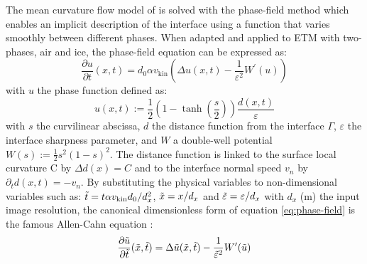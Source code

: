 \documentclass[draft,ms]{agujournal2019}
\begin{document}
The mean curvature flow model of  is solved with the phase-field method which enables an implicit description of the interface using a function that varies smoothly between different phases. When adapted and applied to ETM with two-phases, air and ice, the phase-field equation can be expressed as:\\
\begin{equation}\label{eq:phase-field}\frac{\partial u}{\partial t}(x, t)= d_0 \alpha v_{\mathrm{kin}} \left(\Delta u(x, t)-\frac{1}{\varepsilon^{2}} W^{\prime}(u)\right)\end{equation}
\noindent with $u$ the phase function defined as: \begin{equation}\label{eq:phase-func}
u(x,t) := \frac{1}{2}\left(1-\tanh\left(\frac{s}{2}\right)\right)\frac{d(x,t)}{\varepsilon}
\end{equation}
with $s$ the curvilinear  abscissa, $d$ the distance function from the interface $\Gamma$, $\varepsilon$ the interface sharpness parameter, and $W$ a double-well potential $W(s):=\frac{1}{2} s^{2}(1-s)^{2}$. The distance function is linked to the surface local curvature C by $\Delta d(x) = C$ and to the interface normal speed $v_n$ by $\partial_t d (x,t) = - v_n$. By substituting the physical variables to non-dimensional variables such as: $\Tilde{t} = t \alpha v_{\mathrm{kin}} d_0 / d_x^2 $, $\Tilde{x} = x/d_x$ and $\Tilde{\varepsilon} = \varepsilon/d_x$ with $d_x$ (m) the input image resolution, the canonical dimensionless form of equation \ref{eq:phase-field} is the famous Allen-Cahn equation \cite{bretin_and_denis_discrete-continuous_2015, kaempfer_phase-field_2009}:
\begin{equation}\label{eq:allen-cahn}\frac{\partial \Tilde{u}}{\partial \Tilde{t}}(\Tilde{x}, \Tilde{t})=\Delta \Tilde{u}(\Tilde{x}, \Tilde{t})-\frac{1}{\Tilde{\varepsilon}^{2}} W^{\prime}(\Tilde{u})\end{equation}
\end{document}
